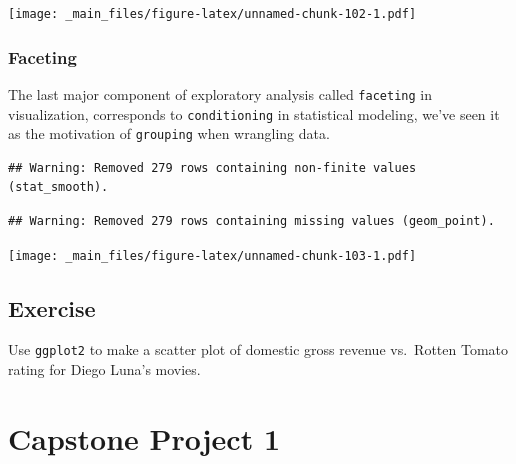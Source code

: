 \documentclass[]{article}
\newenvironment{Shaded}{\begin{snugshade}}{\end{snugshade}}
\newcommand{\KeywordTok}[1]{\textcolor[rgb]{0.13,0.29,0.53}{\textbf{{#1}}}}
\newcommand{\DataTypeTok}[1]{\textcolor[rgb]{0.13,0.29,0.53}{{#1}}}
\newcommand{\StringTok}[1]{\textcolor[rgb]{0.31,0.60,0.02}{{#1}}}
\newcommand{\NormalTok}[1]{{#1}}
\theoremstyle{definition}
\theoremstyle{definition}
\theoremstyle{remark}
\begin{document}
\texttt{[image: \_main\_files/figure-latex/unnamed-chunk-102-1.pdf]}

\subsubsection{Faceting}\label{faceting}

The last major component of exploratory analysis called
\texttt{faceting} in visualization, corresponds to \texttt{conditioning}
in statistical modeling, we've seen it as the motivation of
\texttt{grouping} when wrangling data.

\begin{Shaded}
\end{Shaded}

\begin{verbatim}
## Warning: Removed 279 rows containing non-finite values (stat_smooth).
\end{verbatim}

\begin{verbatim}
## Warning: Removed 279 rows containing missing values (geom_point).
\end{verbatim}

\texttt{[image: \_main\_files/figure-latex/unnamed-chunk-103-1.pdf]}

\subsection{Exercise}\label{exercise-1}

Use \texttt{ggplot2} to make a scatter plot of domestic gross revenue
vs.~Rotten Tomato rating for Diego Luna's movies.

\section{Capstone Project 1}\label{capstone-project-1}
\end{document}
